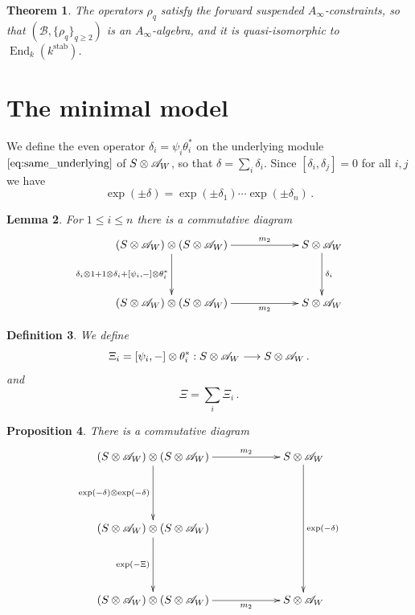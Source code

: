 \documentclass[english,letter paper,12pt,leqno]{article}
\newtheorem{theorem}{Theorem}[section]
\newtheorem{proposition}[theorem]{Proposition}
\newtheorem{lemma}[theorem]{Lemma}
\theoremstyle{example}
\newtheorem{definition}[theorem]{Definition}
\numberwithin{equation}{section}
\def\stab{\operatorname{stab}}
\def\be{\begin{equation}}
\def\ee{\end{equation}}
\DeclareMathOperator{\End}{End}
\begin{document}
\begin{theorem} The operators $\rho_q$ satisfy the forward suspended $A_\infty$-constraints, so that $(\mathscr{B}, \{ \rho_q \}_{q \ge 2})$ is an $A_\infty$-algebra, and it is quasi-isomorphic to $\End_k(k^{\stab})$.
\end{theorem}

\section{The minimal model}

We define the even operator $\delta_i = \psi_i \theta_i^*$ on the underlying module $\eqref{eq:same_underlying}$ of $S \otimes \mathscr{A}_W$, so that $\delta = \sum_i \delta_i$. Since $[ \delta_i, \delta_j ] = 0$ for all $i,j$ we have
\be
\exp(\pm \delta) = \exp(\pm \delta_1) \cdots \exp(\pm \delta_n)\,.
\ee

\begin{lemma} For $1 \le i \le n$ there is a commutative diagram
\be
\xymatrix@C+3pc@R+1pc{
(S \otimes \md{A}_W) \otimes (S \otimes \md{A}_W) \ar[d]_-{\delta_i \otimes 1 + 1 \otimes \delta_i + [\psi_i,-] \otimes \theta_i^*} \ar[r]^-{m_2} & S \otimes \md{A}_W \ar[d]^-{\delta_i}\\
(S \otimes \md{A}_W) \otimes (S \otimes \md{A}_W) \ar[r]_-{m_2} & S \otimes \md{A}_W
}
\ee
\end{lemma}

\begin{definition} We define
\be
\Xi_i = [ \psi_i, - ] \otimes \theta_i^* : S \otimes \md{A}_W \lto S \otimes \md{A}_W\,.
\ee
and
\be
\Xi = \sum_i \Xi_i\,.
\ee
\end{definition}

\begin{proposition} There is a commutative diagram
\be
\xymatrix@C+3pc@R+2pc{
(S \otimes \md{A}_W) \otimes (S \otimes \md{A}_W) \ar[d]_-{\exp(-\delta) \otimes \exp(-\delta)} \ar[r]^-{m_2} & S \otimes \md{A}_W \ar[dd]^-{\exp(-\delta)}\\
(S \otimes \md{A}_W) \otimes (S \otimes \md{A}_W) \ar[d]_-{\exp(-\Xi)}\\
(S \otimes \md{A}_W) \otimes (S \otimes \md{A}_W) \ar[r]_-{m_2} & S \otimes \md{A}_W
}
\ee
\end{proposition}
\end{document}
